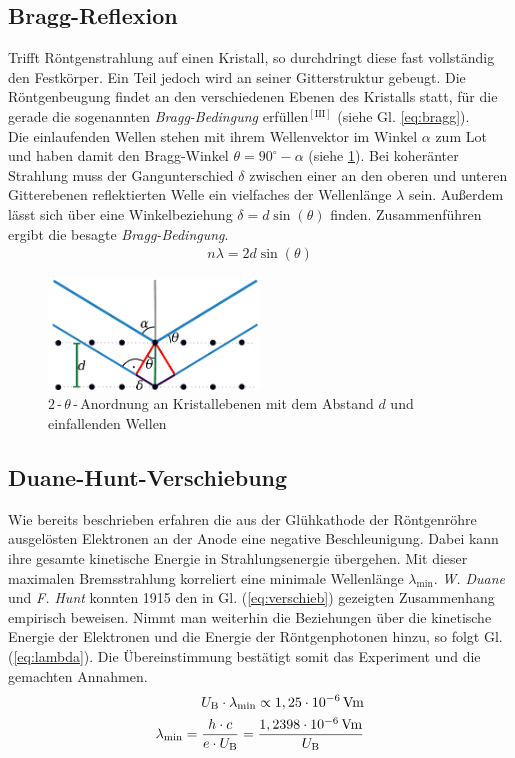 \documentclass[numbers=noenddot,12pt,a4paper]{scrartcl}
\newcommand{\degree}{^\circ}
\newcommand{\ix}[1]{_\text{#1}}
\newcommand{\tilt}[1]{\textit{#1}}
\begin{document}
\subsection{Bragg-Reflexion}
Trifft Röntgenstrahlung auf einen Kristall, so durchdringt diese fast vollständig den Festkörper. Ein Teil jedoch wird an seiner Gitterstruktur gebeugt. Die Röntgenbeugung findet an den verschiedenen Ebenen des Kristalls statt, für die gerade die sogenannten \tilt{Bragg-Bedingung} erfüllen$^{\left[\text{III}\right]}$ (siehe Gl. \ref{eq:bragg}).\\
Die einlaufenden Wellen stehen mit ihrem Wellenvektor im Winkel $\alpha$ zum Lot und haben damit den Bragg-Winkel $\theta=90\degree-\alpha$ (siehe \ref{img:bragg}). Bei koheränter Strahlung muss der Gangunterschied $\delta$ zwischen einer an den oberen und unteren Gitterebenen reflektierten Welle ein vielfaches der Wellenlänge $\lambda$ sein. Außerdem lässt sich über eine Winkelbeziehung $\delta=d\sin\left(\theta\right)$ finden. Zusammenführen ergibt die besagte \tilt{Bragg-Bedingung}.
\begin{align}
	n\lambda=2d\sin\left(\theta\right) \label{eq:bragg}
\end{align}
\begin{figure}[H]
	\centering
	\includegraphics[width=0.5\textwidth]{bragg.pdf}
	\caption{$2$\,-\,$\theta$\,-\,Anordnung an Kristallebenen mit dem Abstand $d$ und einfallenden Wellen}\label{img:bragg}
\end{figure}
\subsection{Duane-Hunt-Verschiebung}
Wie bereits beschrieben erfahren die aus der Glühkathode der Röntgenröhre ausgelösten Elektronen an der Anode eine negative Beschleunigung. Dabei kann ihre gesamte kinetische Energie in Strahlungsenergie übergehen. Mit dieser maximalen Bremsstrahlung korreliert eine minimale Wellenlänge $\lambda\ix{min}$. \tilt{W. Duane} und \tilt{F. Hunt} konnten 1915 den in Gl. (\ref{eq:verschieb}) gezeigten Zusammenhang empirisch beweisen. Nimmt man weiterhin die Beziehungen über die kinetische Energie der Elektronen und die Energie der Röntgenphotonen hinzu, so folgt Gl. (\ref{eq:lambda}). Die Übereinstimmung bestätigt somit das Experiment und die gemachten Annahmen.
\begin{align}
	U\ix{B}\cdot\lambda\ix{min}\propto\unit[1,25\cdot 10^{-6}]{Vm} \label{eq:verschieb} \\
	\lambda\ix{min}=\frac{h\cdot c}{e\cdot U\ix{B}}=\frac{\unit[1,2398\cdot 10^{-6}]{Vm}}{U\ix{B}} \label{eq:lambda}
\end{align}
\newpage
\end{document}
